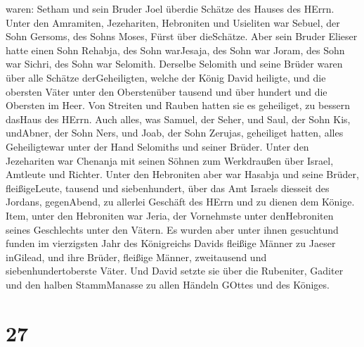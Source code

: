 waren: Setham und sein Bruder Joel überdie Schätze des Hauses des HErrn.
 Unter den Amramiten, Jezehariten, Hebroniten und Usieliten
 war Sebuel, der Sohn Gersoms, des Sohns Moses, Fürst über
dieSchätze.  Aber sein Bruder Elieser hatte einen Sohn
Rehabja, des Sohn warJesaja, des Sohn war Joram, des Sohn war Sichri,
des Sohn war Selomith.  Derselbe Selomith und seine Brüder
waren über alle Schätze derGeheiligten, welche der König David heiligte,
und die obersten Väter unter den Oberstenüber tausend und über hundert
und die Obersten im Heer.  Von Streiten und Rauben hatten
sie es geheiliget, zu bessern dasHaus des HErrn.  Auch
alles, was Samuel, der Seher, und Saul, der Sohn Kis, undAbner, der Sohn
Ners, und Joab, der Sohn Zerujas, geheiliget hatten, alles Geheiligtewar
unter der Hand Selomiths und seiner Brüder.  Unter den
Jezehariten war Chenanja mit seinen Söhnen zum Werkdraußen über Israel,
Amtleute und Richter.  Unter den Hebroniten aber war
Hasabja und seine Brüder, fleißigeLeute, tausend und siebenhundert, über
das Amt Israels diesseit des Jordans, gegenAbend, zu allerlei Geschäft
des HErrn und zu dienen dem Könige.  Item, unter den
Hebroniten war Jeria, der Vornehmste unter denHebroniten seines
Geschlechts unter den Vätern. Es wurden aber unter ihnen gesuchtund
funden im vierzigsten Jahr des Königreichs Davids fleißige Männer zu
Jaeser inGilead,  und ihre Brüder, fleißige Männer,
zweitausend und siebenhundertoberste Väter. Und David setzte sie über
die Rubeniter, Gaditer und den halben StammManasse zu allen Händeln
GOttes und des Königes.

\hypertarget{section-26}{%
\section{27}\label{section-26}}


